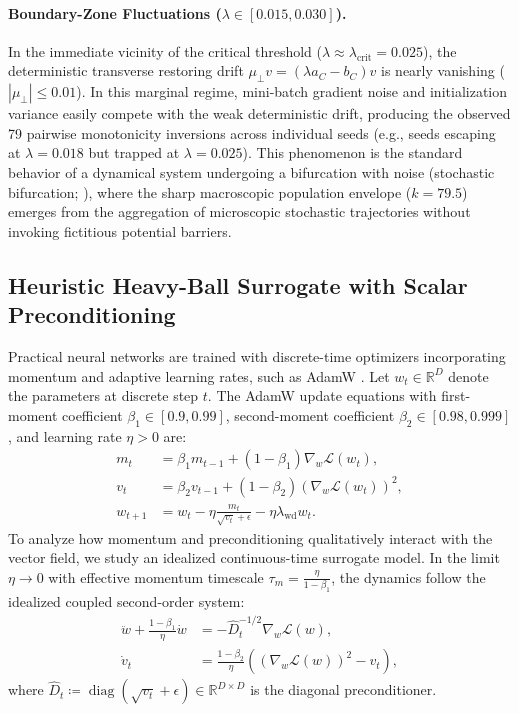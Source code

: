 \documentclass{article}
\theoremstyle{plain}
\theoremstyle{definition}
\DeclareMathOperator{\diag}{diag}
\begin{document}
\paragraph{Boundary-Zone Fluctuations ($\lambda \in [0.015, 0.030]$).}
In the immediate vicinity of the critical threshold ($\lambda \approx \lambda_{\text{crit}} = 0.025$), the deterministic transverse restoring drift $\mu_\perp v = (\lambda a_C - b_C) v$ is nearly vanishing ($|\mu_\perp| \le 0.01$). In this marginal regime, mini-batch gradient noise and initialization variance easily compete with the weak deterministic drift, producing the observed 79 pairwise monotonicity inversions across individual seeds (e.g., seeds escaping at $\lambda=0.018$ but trapped at $\lambda=0.025$). This phenomenon is the standard behavior of a dynamical system undergoing a bifurcation with noise (stochastic bifurcation; \citealt{Horsthemke1984Noise}), where the sharp macroscopic population envelope ($k = 79.5$) emerges from the aggregation of microscopic stochastic trajectories without invoking fictitious potential barriers.
\subsection{Heuristic Heavy-Ball Surrogate with Scalar Preconditioning}
\label{sec:app_adamw_bridge}
Practical neural networks are trained with discrete-time optimizers incorporating momentum and adaptive learning rates, such as AdamW \citep{Loshchilov2019Decoupled}. Let $w_t \in \mathbb{R}^D$ denote the parameters at discrete step $t$. The AdamW update equations with first-moment coefficient $\beta_1 \in [0.9, 0.99]$, second-moment coefficient $\beta_2 \in [0.98, 0.999]$, and learning rate $\eta > 0$ are:
\begin{align}
    m_t &= \beta_1 m_{t-1} + (1 - \beta_1) \nabla_w \mathcal{L}(w_t), \\
    v_t &= \beta_2 v_{t-1} + (1 - \beta_2) (\nabla_w \mathcal{L}(w_t))^2, \\
    w_{t+1} &= w_t - \eta \frac{m_t}{\sqrt{v_t} + \epsilon} - \eta \lambda_{\text{wd}} w_t.
\end{align}
To analyze how momentum and preconditioning qualitatively interact with the vector field, we study an idealized continuous-time surrogate model. In the limit $\eta \to 0$ with effective momentum timescale $\tau_m = \frac{\eta}{1 - \beta_1}$, the dynamics follow the idealized coupled second-order system:
\begin{align}
    \ddot{w} + \frac{1 - \beta_1}{\eta} \dot{w} &= -\hat{D}_t^{-1/2} \nabla_w \mathcal{L}(w), \label{eq:underdamped_adamw} \\
    \dot{v}_t &= \frac{1 - \beta_2}{\eta} \left( (\nabla_w \mathcal{L}(w))^2 - v_t \right),
\end{align}
where $\hat{D}_t \coloneqq \diag(\sqrt{v_t} + \epsilon) \in \mathbb{R}^{D \times D}$ is the diagonal preconditioner.
\end{document}
